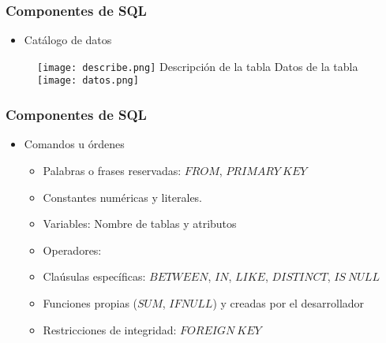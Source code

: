 
\begin{frame}

	\frametitle{Componentes de SQL}
	
	
	\begin{itemize}
	
		\item Catálogo de datos

	\end{itemize}
	
	\begin{figure}[h]
		\texttt{[image: describe.png]} Descripción de la tabla
		Datos de la tabla \texttt{[image: datos.png]} 
	\end{figure}

\end{frame}



\begin{frame}
	
	\frametitle{Componentes de SQL}
	
	
	\begin{itemize}
		
		\item Comandos u órdenes
		\begin{itemize}
			\item<2-> Palabras o frases reservadas: $FROM$, $PRIMARY\ KEY$
			\item<3-> Constantes numéricas y literales.
			\item<4-> Variables: Nombre de tablas y atributos
			\item<5-> Operadores: 

			
		\item<7-> Claúsulas específicas: $BETWEEN$, $IN$, $LIKE$, $DISTINCT$, $IS\ NULL$
		\item<8-> Funciones propias ($SUM$, $IFNULL$) y creadas por el desarrollador
		\item<9-> Restricciones de integridad: $FOREIGN\ KEY$
			
		\end{itemize}
		
	\end{itemize}
	
\end{frame}

